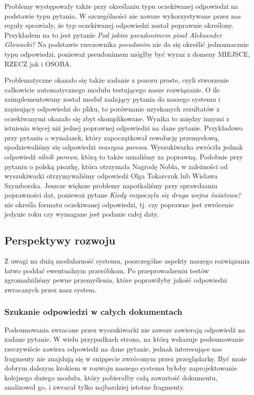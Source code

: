 Problemy występowały także przy określaniu typu oczekiwanej odpowiedzi na podstawie typu pytania. W szczególności nie zawsze wykorzystywane przez nas reguły sprawiały, że typ oczekiwanej odpowiedzi został poprawnie określony. Przykładem na to jest pytanie \emph{Pod jakim pseudonimem pisał Aleksander Głowacki?} Na podstawie rzeczownika \emph{pseudonim} nie da się określić jednoznacznie typu odpowiedzi, ponieważ pseudonimem mógłby być wyraz z domeny MIEJSCE, RZECZ jak i OSOBA.

Problematyczne okazało się także zadanie z pozoru proste, czyli stworzenie całkowicie automatycznego modułu testującego nasze rozwiązanie. O ile zaimplementowany został moduł zadający pytania do naszego systemu i zapisujący odpowiedzi do pliku, to porównanie uzyskanych rezultatów z oczekiwanymi okazało się zbyt skomplikowane. Wynika to między innymi z istnienia więcej niż jednej poprawnej odpowiedzi na dane pytanie. Przykładowo przy pytaniu o wynalazek, który zapoczątkował rewolucję przemysłową, spodziewaliśmy się odpowiedzi \emph{maszyna parowa}. Wyszukiwarka zwróciła jednak odpowiedź \emph{silnik parowa}, którą to także uznaliśmy za poprawną. Podobnie przy pytaniu o polską pisarkę, która otrzymała Nagrodę Nobla, w zależności od wyszukiwarki otrzymywaliśmy odpowiedź Olga Tokarczuk lub Wisława Szymborska. Jeszcze większe problemy napotkaliśmy przy sprawdzaniu poprawności dat, ponieważ pytane \emph{Kiedy rozpoczęła się druga wojna światowa?} nie określa formatu oczekiwanej odpowiedzi, tj. czy poprawne jest zwrócenie jedynie roku czy wymagane jest podanie całej daty. 

\subsection{Perspektywy rozwoju}
Z uwagi na dużą modularność systemu, poszczególne aspekty naszego rozwiązania łatwo poddać ewentualnym przeróbkom. Po przeprowadzeniu testów zgromadziliśmy pewne przemyślenia, które poprawiłyby jakość odpowiedzi zwracanych przez nasz system. 

\subsubsection{Szukanie odpowiedzi w całych dokumentach}
Podsumowania zwracane przez wyszukiwarki nie zawsze zawierają odpowiedź na zadane pytanie. W wielu przypadkach strona, na którą wskazuje podsumowanie rzeczywiście zawiera odpowiedź na dane pytanie, jednak interesujące nas fragmenty nie znajdują się w snippecie zwróconym przez przeglądarkę. Być może dobrym dalszym krokiem w rozwoju naszego systemu byłoby zaprojektowanie kolejnego dużego modułu, który pobierałby całą zawartość dokumentu, analizował go, i zwracał tylko najbardziej istotne fragmenty.

